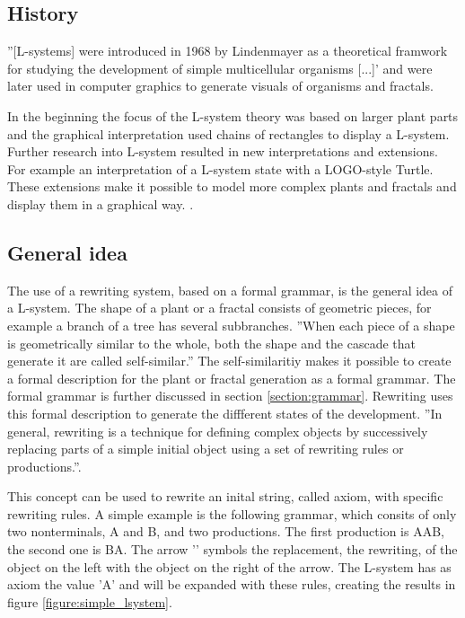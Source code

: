 \documentclass[english]{cpp-hmwk}
\begin{document}
\subsection{History}
\label{section:history}
''[L-systems] were introduced in 1968 by Lindenmayer as a theoretical framwork for studying the development of simple multicellular organisms [...]'\cite[Preface, p.~VI]{prusinkiewiczp.lindenmayera.2004} and were later used in computer graphics to generate visuals of organisms and fractals.

In the beginning the focus of the L-system theory was based on larger plant parts and the graphical interpretation used chains of rectangles to display a L-system. Further research into L-system resulted in new interpretations and extensions. For example an interpretation of a L-system state with a LOGO-style Turtle. These extensions make it possible to model more complex plants and fractals and display them in a graphical way. \cite[Cf. Chapter 1.3, p.~6]{prusinkiewiczp.lindenmayera.2004}.

\subsection{General idea}
\label{section:gerneralidea}
The use of a rewriting system, based on a formal grammar, is the general idea of a L-system. The shape of a plant or a fractal consists of geometric pieces, for example a branch of a tree has several subbranches. ''When each piece of a shape is geometrically similar to the whole, both the shape and the cascade that generate it are called self-similar.''\cite[Chapter 6, p.~34]{benoitmandelbrot1982} The self-similaritiy makes it possible to create a formal description for the plant or fractal generation as a formal grammar. The formal grammar is further discussed in section \ref{section:grammar}. Rewriting uses this formal description to generate the diffferent states of the development. ''In general, rewriting is a technique for defining complex objects by successively replacing parts of a simple initial object using a set of rewriting rules or productions.''\cite[Chapter 1.1,  p.~1]{prusinkiewiczp.lindenmayera.2004}. 

This concept can be used to rewrite an inital string, called axiom, with specific rewriting rules.
A simple example is the following grammar, which consits of only two nonterminals, A and B, and two productions. 
The first production is A\rightarrow AB, the second one is B\rightarrow A. The arrow '\rightarrow' symbols the replacement, the rewriting, of the object on the left with the object on the right of the arrow.
The L-system has as axiom the value 'A' and will be expanded with these rules, creating the results in figure \ref{figure:simple_lsystem}.
\end{document}
